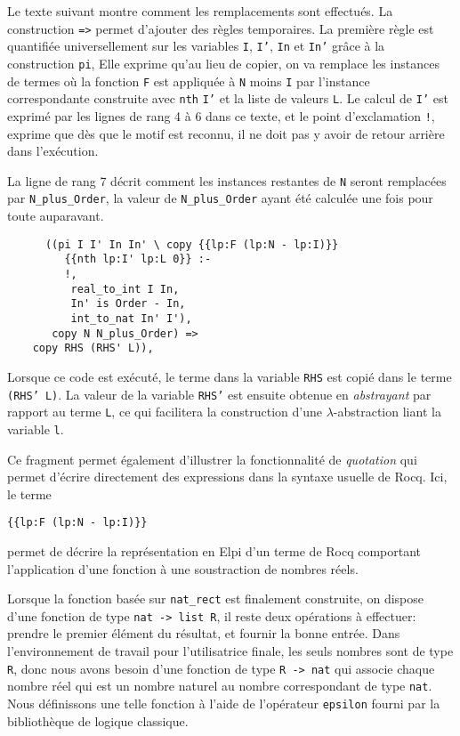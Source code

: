 \documentclass{modjflart}
\begin{document}
Le texte suivant montre comment les remplacements sont effectués.  La
construction \texttt{=>} permet d'ajouter des règles temporaires.
La première règle est quantifiée universellement sur les variables
\texttt{I}, \texttt{I'}, \texttt{In} et \texttt{In'} grâce à la construction \texttt{pi},
Elle exprime qu'au lieu de copier, on va remplace les instances de termes
où la fonction \texttt{F} est
appliquée à \texttt{N} moins \texttt{I} par l'instance
correspondante construite avec \texttt{nth} \texttt{I'} et la liste de
valeurs
\texttt{L}.  Le calcul de \texttt{I'} est exprimé par les lignes de rang 4 à 6 dans
ce texte, et le point d'exclamation \texttt{!}, exprime que dès que le
motif est reconnu, il ne doit pas y avoir de retour arrière dans l'exécution.

La ligne de rang 7 décrit comment les instances restantes de \texttt{N} seront
remplacées par \texttt{N\_plus\_Order}, la valeur de
\texttt{N\_plus\_Order} ayant été calculée une fois pour toute auparavant.
\begin{verbatim}
      ((pi I I' In In' \ copy {{lp:F (lp:N - lp:I)}}
         {{nth lp:I' lp:L 0}} :-
         !,
          real_to_int I In,
          In' is Order - In,
          int_to_nat In' I'),
       copy N N_plus_Order) =>
    copy RHS (RHS' L)),
\end{verbatim}
Lorsque ce code est exécuté, le terme dans la variable \texttt{RHS} est copié
dans le terme \texttt{(RHS' L)}.  La valeur de la variable
\texttt{RHS'} est ensuite
obtenue en {\em abstrayant} par rapport au terme \texttt{L}, ce qui facilitera
la construction d'une \(\lambda\)-abstraction liant la variable \texttt{l}.

Ce fragment permet également d'illustrer la fonctionnalité de {\em
  quotation} qui permet d'écrire directement des expressions dans la
syntaxe usuelle de Rocq.  Ici, le terme
\begin{center}
\texttt{\{\{lp:F (lp:N -  lp:I)\}\}}
\end{center}
permet de décrire la représentation en Elpi d'un terme de
Rocq comportant l'application d'une fonction à une soustraction de
nombres réels.

Lorsque la fonction basée sur \texttt{nat\_rect} est finalement
construite, on dispose d'une fonction de type \texttt{nat -> list R}, il
reste deux opérations à effectuer: prendre le premier élément du
résultat, et fournir la bonne entrée.  Dans l'environnement de travail
pour l'utilisatrice finale, les seuls nombres sont de type \texttt{R},
donc nous avons besoin d'une fonction de type \texttt{R -> nat} qui
associe chaque nombre réel qui est un nombre naturel au nombre
correspondant de type \texttt{nat}.  Nous définissons une telle fonction
à l'aide de l'opérateur \texttt{epsilon} fourni par la bibliothèque de
logique classique.
\end{document}
